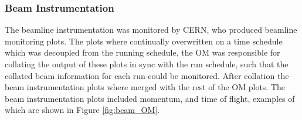 \subsubsection*{Beam Instrumentation}
The beamline instrumentation was monitored by CERN, who produced beamline
monitoring plots\cite{Booth:2019brj}. The plots where continually overwritten 
on a time schedule which was decoupled from the \protodune{} running schedule, 
the OM was responsible for collating the output of these plots in sync with 
the \protodune{} run schedule, such that the collated beam information for 
each run could be monitored. After collation the beam instrumentation plots 
where merged with the rest of the OM plots. The beam instrumentation plots 
included momentum, and time of flight, examples of which are shown in 
Figure \ref{fig:beam_OM}.

